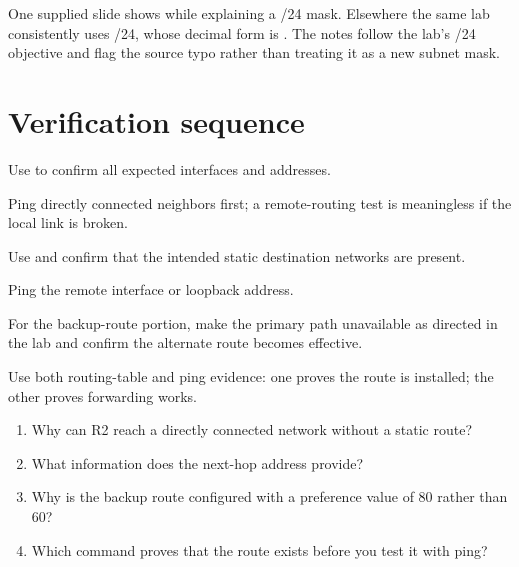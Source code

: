 \begin{pitfall}
One supplied slide shows  while explaining a /24 mask. Elsewhere the same lab consistently uses /24, whose decimal form is . The notes follow the lab's /24 objective and flag the source typo rather than treating it as a new subnet mask.
\end{pitfall}

\section{Verification sequence}
\begin{utpsteps}
\item Use  to confirm all expected interfaces and addresses.
\item Ping directly connected neighbors first; a remote-routing test is meaningless if the local link is broken.
\item Use  and confirm that the intended static destination networks are present.
\item Ping the remote interface or loopback address.
\item For the backup-route portion, make the primary path unavailable as directed in the lab and confirm the alternate route becomes effective.
\end{utpsteps}

\begin{verification}
Use both routing-table and ping evidence: one proves the route is installed; the other proves forwarding works.
\end{verification}

\begin{quickcheck}
\begin{enumerate}
\item Why can R2 reach a directly connected network without a static route?
\item What information does the next-hop address provide?
\item Why is the backup route configured with a preference value of 80 rather than 60?
\item Which command proves that the route exists before you test it with ping?
\end{enumerate}
\end{quickcheck}
